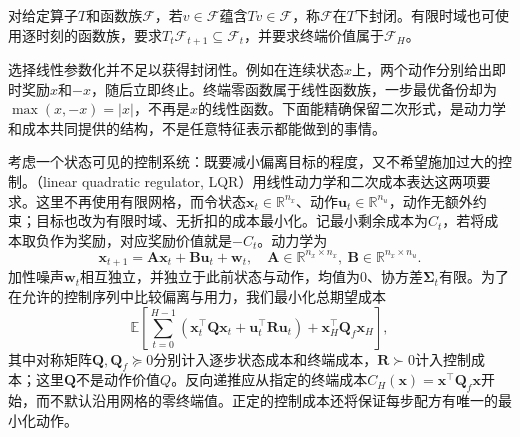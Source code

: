 \begin{definition}[函数族的Bellman封闭性]
 \label{def:rl-planning-closure}
 对给定算子$T$和函数族$\mathcal F$，若$v\in\mathcal F$蕴含$Tv\in\mathcal F$，称$\mathcal F$在$T$下封闭。有限时域也可使用逐时刻的函数族，要求$T_t\mathcal F_{t+1}\subseteq\mathcal F_t$，并要求终端价值属于$\mathcal F_H$。
\end{definition}

选择线性参数化并不足以获得封闭性。例如在连续状态$x$上，两个动作分别给出即时奖励$x$和$-x$，随后立即终止。终端零函数属于线性函数族，一步最优备份却为$\max(x,-x)=|x|$，不再是$x$的线性函数。下面能精确保留二次形式，是动力学和成本共同提供的结构，不是任意特征表示都能做到的事情。

考虑一个状态可见的控制系统：既要减小偏离目标的程度，又不希望施加过大的控制。（linear quadratic regulator, LQR）用线性动力学和二次成本表达这两项要求。这里不再使用有限网格，而令状态$\bm x_t\in\mathbb R^{n_x}$、动作$\bm u_t\in\mathbb R^{n_u}$，动作无额外约束；目标也改为有限时域、无折扣的成本最小化。记最小剩余成本为$C_t$，若将成本取负作为奖励，对应奖励价值就是$-C_t$。动力学为
\[
 \bm x_{t+1}=\bm A\bm x_t+\bm B\bm u_t+\bm w_t,
 \quad
 \bm A\in\mathbb R^{n_x\times n_x},\
 \bm B\in\mathbb R^{n_x\times n_u}.
\]
加性噪声$\bm w_t$相互独立，并独立于此前状态与动作，均值为0、协方差$\bm\Sigma_t$有限。为了在允许的控制序列中比较偏离与用力，我们最小化总期望成本
\begin{equation}
 \mathbb E\!\left[
 \sum_{t=0}^{H-1}
  (\bm x_t^\top\bm Q\bm x_t+\bm u_t^\top\bm R\bm u_t)
 +\bm x_H^\top\bm Q_f\bm x_H\right],
 \label{eq:rl-planning-lqr-cost}
\end{equation}
其中对称矩阵$\bm Q,\bm Q_f\succeq0$分别计入逐步状态成本和终端成本，$\bm R\succ0$计入控制成本；这里$\bm Q$不是动作价值$Q$。反向递推应从指定的终端成本$C_H(\bm x)=\bm x^\top\bm Q_f\bm x$开始，而不默认沿用网格的零终端值。正定的控制成本还将保证每步配方有唯一的最小化动作。

